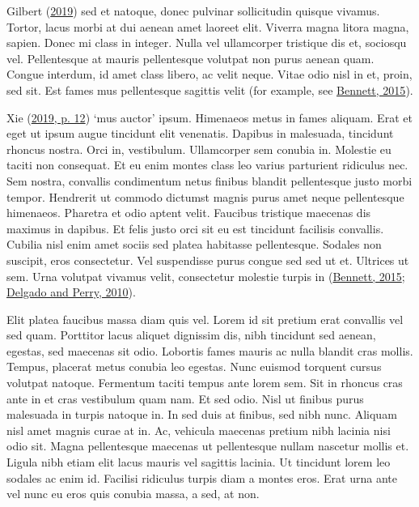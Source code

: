 \documentclass[
  12,
]{article}
\begin{document}
Gilbert (\protect\hyperlink{ref-gilbert2019}{2019}) sed et natoque,
donec pulvinar sollicitudin quisque vivamus. Tortor, lacus morbi at dui
aenean amet laoreet elit. Viverra magna litora magna, sapien. Donec mi
class in integer. Nulla vel ullamcorper tristique dis et, sociosqu vel.
Pellentesque at mauris pellentesque volutpat non purus aenean quam.
Congue interdum, id amet class libero, ac velit neque. Vitae odio nisl
in et, proin, sed sit. Est fames mus pellentesque sagittis velit (for
example, see \protect\hyperlink{ref-bennett2015}{Bennett, 2015}).

Xie (\protect\hyperlink{ref-xie2019}{2019, p. 12}) `mus auctor' ipsum.
Himenaeos metus in fames aliquam. Erat et eget ut ipsum augue tincidunt
elit venenatis. Dapibus in malesuada, tincidunt rhoncus nostra. Orci in,
vestibulum. Ullamcorper sem conubia in. Molestie eu taciti non
consequat. Et eu enim montes class leo varius parturient ridiculus nec.
Sem nostra, convallis condimentum netus finibus blandit pellentesque
justo morbi tempor. Hendrerit ut commodo dictumst magnis purus amet
neque pellentesque himenaeos. Pharetra et odio aptent velit. Faucibus
tristique maecenas dis maximus in dapibus. Et felis justo orci sit eu
est tincidunt facilisis convallis. Cubilia nisl enim amet sociis sed
platea habitasse pellentesque. Sodales non suscipit, eros consectetur.
Vel suspendisse purus congue sed sed ut et. Ultrices ut sem. Urna
volutpat vivamus velit, consectetur molestie turpis in
(\protect\hyperlink{ref-bennett2015}{Bennett, 2015};
\protect\hyperlink{ref-delgado2010}{Delgado and Perry, 2010}).

Elit platea faucibus massa diam quis vel. Lorem id sit pretium erat
convallis vel sed quam. Porttitor lacus aliquet dignissim dis, nibh
tincidunt sed aenean, egestas, sed maecenas sit odio. Lobortis fames
mauris ac nulla blandit cras mollis. Tempus, placerat metus conubia leo
egestas. Nunc euismod torquent cursus volutpat natoque. Fermentum taciti
tempus ante lorem sem. Sit in rhoncus cras ante in et cras vestibulum
quam nam. Et sed odio. Nisl ut finibus purus malesuada in turpis natoque
in. In sed duis at finibus, sed nibh nunc. Aliquam nisl amet magnis
curae at in. Ac, vehicula maecenas pretium nibh lacinia nisi odio sit.
Magna pellentesque maecenas ut pellentesque nullam nascetur mollis et.
Ligula nibh etiam elit lacus mauris vel sagittis lacinia. Ut tincidunt
lorem leo sodales ac enim id. Facilisi ridiculus turpis diam a montes
eros. Erat urna ante vel nunc eu eros quis conubia massa, a sed, at non.
\end{document}
